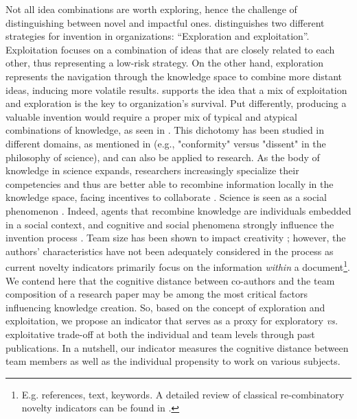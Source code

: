 Not all idea combinations are worth exploring, hence the challenge of distinguishing between novel and impactful ones. \citep{march1991exploration}  distinguishes two different strategies for invention in organizations: ``Exploration and exploitation''. Exploitation focuses on a combination of ideas that are closely related to each other, thus representing a low-risk strategy. On the other hand, exploration represents the navigation through the knowledge space to combine more distant ideas, inducing more volatile results. \cite{march1991exploration} supports the idea that a mix of exploitation and exploration is the key to organization's survival. Put differently, producing a valuable invention would require a proper mix of typical and atypical combinations of knowledge, as seen in \cite{uzzi2013atypical}. This dichotomy has been studied in different domains, as mentioned in \cite{foster2015tradition} (e.g., "conformity" versus "dissent" in the philosophy of science), and can also be applied to research. As the body of knowledge in science expands, researchers increasingly specialize their competencies \citep{jones2008multi, jones2009burden} and thus are better able to recombine information locally in the knowledge space, facing incentives to collaborate \citep{fleming2001recombinant, boudreau2016looking}. Science is seen as a social phenomenon \citep{fleck2012genesis}. Indeed, agents that recombine knowledge are individuals embedded in a social context, and cognitive and social phenomena strongly influence the invention process \citep{fleming2001recombinant}. Team size has been shown to impact creativity \citep{paulus2003group, shin2007educational, wuchty2007increasing, falk2011mapping, erren2017small, mueller2019building}; however, the authors' characteristics have not been adequately considered in the process as current novelty indicators primarily focus on the information \textit{within} a document\footnote{ \justifying E.g. references, text, keywords. A detailed review of classical re-combinatory novelty indicators can be found in \cite{pelletier2022novelpy}.}. We contend here that the cognitive distance between co-authors and the team composition of a research paper may be among the most critical factors influencing knowledge creation.
So, based on the concept of exploration and exploitation, we propose an indicator that serves as a proxy for exploratory \textit{vs.} exploitative trade-off at both the individual and team levels through past publications. In a nutshell, our indicator measures the cognitive distance between team members as well as the individual propensity to work on various subjects.



